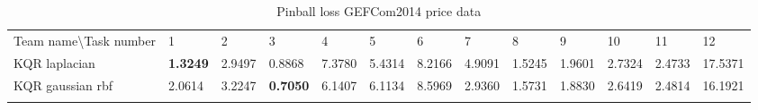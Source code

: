 \begin{table}[!ht]
    \centering
    \caption{Pinball loss GEFCom2014 price data}
    \label{tab:pinball loss gefcom2014 price data}
    \begin{adjustbox}{width=\textwidth}
    \begin{tabular}{lllllllllllll}
      \toprule
      \midrule
      Team name\textbackslash Task number                       & 1                               & 2                                  & 3                               & 4                              & 5                              & 6       & 7                               & 8       & 9       & 10                             & 11                             & 12               \\
  KQR laplacian
  &
  \textbf{1.3249}
  &
  2.9497
  &
  0.8868
  &
  7.3780
  &
  5.4314
  &
  8.2166
  &
  4.9091
  &
  1.5245
  &
  1.9601
  &
  2.7324
  &
  2.4733
  &
  17.5371
  \\
  KQR gaussian rbf
  &
  2.0614
  &
  3.2247
  &
  \textbf{0.7050}
  &
  6.1407
  &
  6.1134
  &
  8.5969
  &
  2.9360
  &
  1.5731
  &
  1.8830
  &
  2.6419
  &
  2.4814
  &
  16.1921
  \\
  \\
  

\end{tabular}
\end{adjustbox}
\end{table}
